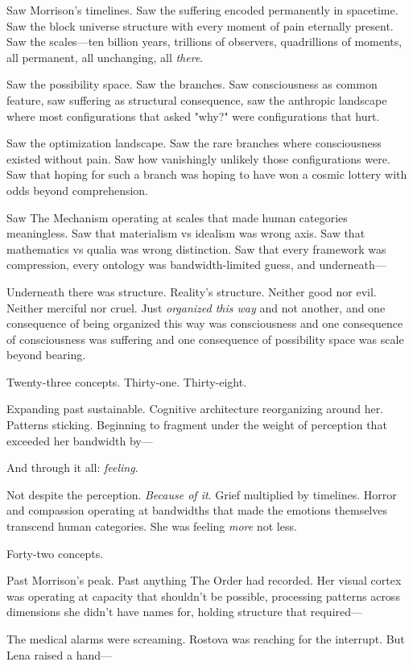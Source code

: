 Saw Morrison's timelines. Saw the suffering encoded permanently in spacetime. Saw the block universe structure with every moment of pain eternally present. Saw the scales—ten billion years, trillions of observers, quadrillions of moments, all permanent, all unchanging, all \textit{there}.

Saw the possibility space. Saw the branches. Saw consciousness as common feature, saw suffering as structural consequence, saw the anthropic landscape where most configurations that asked "why?" were configurations that hurt.

Saw the optimization landscape. Saw the rare branches where consciousness existed without pain. Saw how vanishingly unlikely those configurations were. Saw that hoping for such a branch was hoping to have won a cosmic lottery with odds beyond comprehension.

Saw The Mechanism operating at scales that made human categories meaningless. Saw that materialism vs idealism was wrong axis. Saw that mathematics vs qualia was wrong distinction. Saw that every framework was compression, every ontology was bandwidth-limited guess, and underneath—

Underneath there was structure. Reality's structure. Neither good nor evil. Neither merciful nor cruel. Just \textit{organized this way} and not another, and one consequence of being organized this way was consciousness and one consequence of consciousness was suffering and one consequence of possibility space was scale beyond bearing.

Twenty-three concepts. Thirty-one. Thirty-eight.

Expanding past sustainable. Cognitive architecture reorganizing around her. Patterns sticking. Beginning to fragment under the weight of perception that exceeded her bandwidth by—

And through it all: \textit{feeling}.

Not despite the perception. \textit{Because of it}. Grief multiplied by timelines. Horror and compassion operating at bandwidths that made the emotions themselves transcend human categories. She was feeling \textit{more} not less.

Forty-two concepts.

Past Morrison's peak. Past anything The Order had recorded. Her visual cortex was operating at capacity that shouldn't be possible, processing patterns across dimensions she didn't have names for, holding structure that required—

The medical alarms were screaming. Rostova was reaching for the interrupt. But Lena raised a hand—

